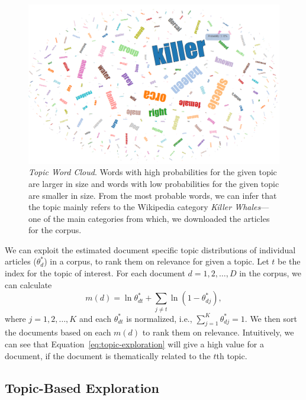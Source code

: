 \begin{figure}[htb]\centering 
\includegraphics[width=.8\textwidth]{images/topic_visualization.png}
\caption{\textsl{Topic Word Cloud}. Words with high probabilities for the 
given topic are larger in size and words with low probabilities for 
the given topic are smaller in size. From the most probable words, 
we can infer that the topic mainly refers to the Wikipedia category 
\textit{Killer Whales}---one of the main categories from which, we 
downloaded the articles for the corpus.}
\label{fig:topic-word-cloud}
\end{figure}

We can exploit the estimated document specific topic distributions 
 of individual articles ($\theta_d^{*}$) in a corpus, to rank them on 
relevance for given a topic. Let $t$ be the index for the topic of 
interest. For each document $d = 1, 2, \ldots, D$ in the corpus, we 
can calculate~\cite{George2012}
\begin{equation}
m(d) = \ln \theta^*_{dt} + \sum_{j \neq t}{\ln (1 - \theta^*_{dj})},
\label{eq:topic-exploration}
\end{equation} 
where $j = 1, 2, \ldots, K$ and each $\theta^*_{dt}$ is 
normalized, i.e., $\sum_{j=1}^{K}{\theta^*_{dj}} = 1$. We then sort 
the documents based on each $m(d)$ to rank them on relevance. 
Intuitively, we can see that Equation~\ref{eq:topic-exploration} 
will give a high value for a document, if the document is 
thematically related to the $t$th topic. 

\subsection{Topic-Based Exploration}

